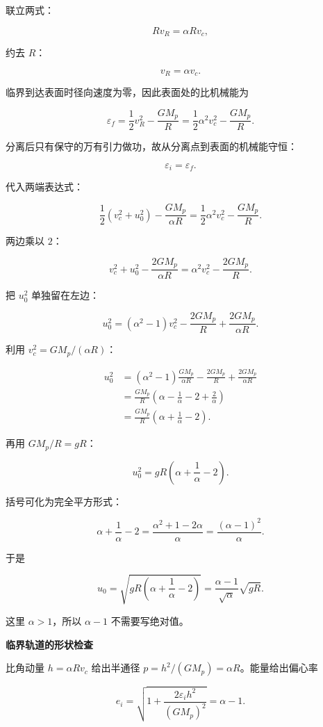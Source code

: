\documentclass[12pt,a4paper,UTF8]{ctexart}
\begin{document}
联立两式：

\[Rv_R=\alpha Rv_c,\]

约去 \(R\)：

\[v_R=\alpha v_c.\]

临界到达表面时径向速度为零，因此表面处的比机械能为

\[\varepsilon_f=
\frac12v_R^2-\frac{GM_{\!p}}{R}
=\frac12\alpha^2v_c^2-\frac{GM_{\!p}}{R}.\]

分离后只有保守的万有引力做功，故从分离点到表面的机械能守恒：

\[\varepsilon_i=\varepsilon_f.\]

代入两端表达式：

\[\frac12(v_c^2+u_0^2)-\frac{GM_{\!p}}{\alpha R}
=\frac12\alpha^2v_c^2-\frac{GM_{\!p}}{R}.\]

两边乘以 \(2\)：

\[v_c^2+u_0^2-\frac{2GM_{\!p}}{\alpha R}
=\alpha^2v_c^2-\frac{2GM_{\!p}}{R}.\]

把 \(u_0^2\) 单独留在左边：

\[u_0^2=(\alpha^2-1)v_c^2
-\frac{2GM_{\!p}}{R}
+\frac{2GM_{\!p}}{\alpha R}.\]

利用 \(v_c^2=GM_{\!p}/(\alpha R)\)：

\[\begin{aligned}
u_0^2
&=(\alpha^2-1)\frac{GM_{\!p}}{\alpha R}
-\frac{2GM_{\!p}}{R}
+\frac{2GM_{\!p}}{\alpha R}\\
&=\frac{GM_{\!p}}{R}
\left(\alpha-\frac1\alpha-2+\frac2\alpha\right)\\
&=\frac{GM_{\!p}}{R}
\left(\alpha+\frac1\alpha-2\right).
\end{aligned}\]

再用 \(GM_{\!p}/R=gR\)：

\[u_0^2=gR\left(\alpha+\frac1\alpha-2\right).\]

括号可化为完全平方形式：

\[\alpha+\frac1\alpha-2
=\frac{\alpha^2+1-2\alpha}{\alpha}
=\frac{(\alpha-1)^2}{\alpha}.\]

于是

\[u_0=\sqrt{gR\left(\alpha+\frac1\alpha-2\right)}
=\frac{\alpha-1}{\sqrt{\alpha}}\sqrt{gR}.\]

这里 \(\alpha>1\)，所以 \(\alpha-1\) 不需要写绝对值。

\textbf{临界轨道的形状检查}

比角动量 \(h=\alpha Rv_c\) 给出半通径
\(p=h^2/(GM_p)=\alpha R\)。能量给出偏心率

\[e_i=\sqrt{1+\frac{2\varepsilon_i h^2}{(GM_p)^2}}=\alpha-1.\]
\end{document}
